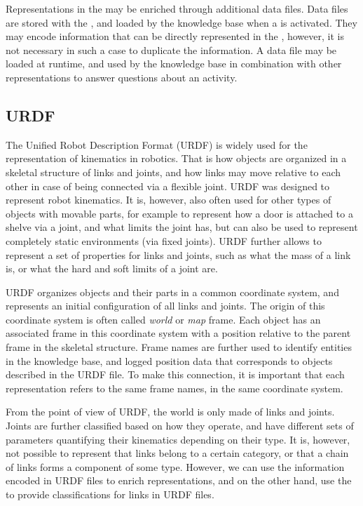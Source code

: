 Representations in the \neembak may be enriched through additional data files.
Data files are stored with the \neembak, and loaded by the \ease knowledge base when a \neem is activated.
They may encode information that can be directly represented in the \neem, however, it is not necessary in such a case to duplicate the information.
A data file may be loaded at runtime, and used by the knowledge base in combination with other representations to answer questions about an activity.

\subsection{URDF}
\label{sec:background:urdf}

The Unified Robot Description Format (URDF) is widely used for the representation of kinematics in robotics. That is how objects are organized in a skeletal structure of links and joints, and how links may move relative to each other in case of being connected via a flexible joint.
URDF was designed to represent robot kinematics.
It is, however, also often used for other types of objects with movable parts, for example to represent how a door is attached to a shelve via a joint, and what limits the joint has, but can also be used to represent completely static environments (via fixed joints).
URDF further allows to represent a set of properties for links and joints, such as what the mass of a link is, or what the hard and soft limits of a joint are.

URDF organizes objects and their parts in a common coordinate system, and represents an initial configuration of all links and joints.
The origin of this coordinate system is often called \emph{world} or \emph{map} frame.
Each object has an associated frame in this coordinate system with a position relative to the parent frame in the skeletal structure.
Frame names are further used to identify entities in the knowledge base, and logged position data that corresponds to objects described in the URDF file.
To make this connection, it is important that each representation refers to the same frame names, in the same coordinate system.

From the point of view of URDF, the world is only made of links and joints.
Joints are further classified based on how they operate, and have different sets of parameters quantifying their kinematics depending on their type.
It is, however, not possible to represent that links belong to a certain category, or that a chain of links forms a component of some type.
However, we can use the information encoded in URDF files to enrich \neembak representations, and on the other hand, use the \neembak to provide classifications for links in URDF files.

